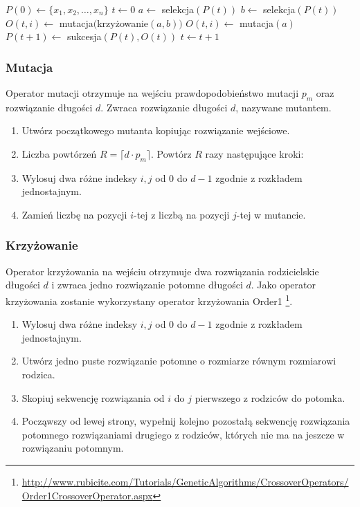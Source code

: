 \documentclass[12pt, a4paper]{article}
\begin{document}
\begin{algorithm}[!htb]
\label{ea}
\begin{algorithmic}[1]
  \State $P(0) \gets \{x_1, x_2, \ldots, x_n\}$
  \State $t \gets 0$
      \State $a \gets$ selekcja$(P(t))$
	\State $b \gets$ selekcja$(P(t))$
	\State $O(t,i) \gets$ mutacja$($krzy{\.z}owanie$(a, b))$
      \Else
	\State $O(t,i) \gets$ mutacja$(a)$
      \EndIf
    \EndFor
    \State $P(t+1) \gets$ sukcesja$(P(t),O(t))$
    \State $t \gets t+1$
  \EndWhile
\EndFunction
\end{algorithmic}
\end{algorithm}

\subsubsection{Mutacja}

Operator mutacji otrzymuje na wejściu prawdopodobieństwo mutacji $p_m$ oraz rozwiązanie długości $d$.
Zwraca rozwiązanie długości $d$, nazywane mutantem.

\begin{enumerate}
 \item Utwórz początkowego mutanta kopiując rozwiązanie wejściowe.
 \item Liczba powtórzeń $R = \lceil d \cdot  p_m \rceil$. Powtórz $R$ razy następujące kroki:
 \item Wylosuj dwa różne indeksy $i, j$ od 0 do $d-1$ zgodnie z rozkładem jednostajnym.
 \item Zamień liczbę na pozycji $i$-tej z liczbą na pozycji $j$-tej w mutancie.
\end{enumerate}

\subsubsection{Krzyżowanie}

Operator krzyżowania na wejściu otrzymuje dwa rozwiązania rodzicielskie długości $d$ i zwraca jedno rozwiązanie potomne długości $d$. 
Jako operator krzyżowania zostanie wykorzystany operator krzyżowania Order1 \footnote{\url{http://www.rubicite.com/Tutorials/GeneticAlgorithms/CrossoverOperators/Order1CrossoverOperator.aspx}}.
\begin{enumerate}
 \item Wylosuj dwa różne indeksy $i, j$ od 0 do $d-1$ zgodnie z rozkładem jednostajnym.
 \item Utwórz jedno puste rozwiązanie potomne o rozmiarze równym rozmiarowi rodzica.
 \item Skopiuj sekwencję rozwiązania od $i$ do $j$ pierwszego z rodziców do potomka.
 \item Począwszy od lewej strony, wypełnij kolejno pozostałą sekwencję rozwiązania potomnego rozwiązaniami drugiego z rodziców, których nie ma na jeszcze w rozwiązaniu potomnym.
\end{enumerate}
\end{document}
